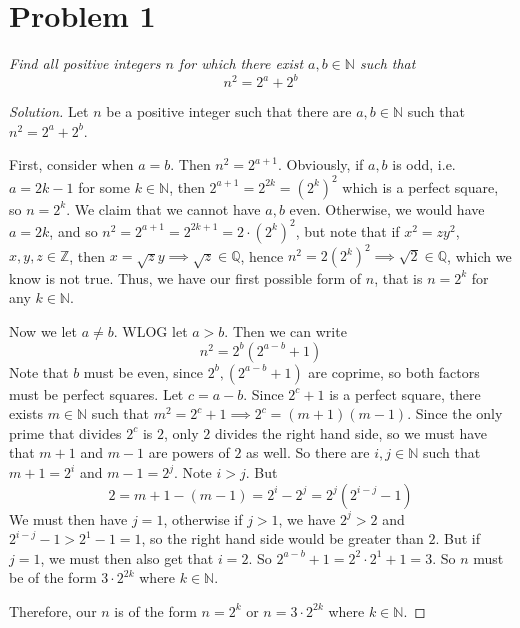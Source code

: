 \documentclass{article}
\newcommand{\N}{{\mathbb N}}
\newcommand{\Z}{{\mathbb Z}}
\newcommand{\Q}{{\mathbb Q}}
\begin{document}
\section*{Problem 1}
{\it Find all positive integers $n$ for which there exist $a,b \in \N$ such that
	\[
		n^2 = 2^a + 2^b
	\]
}
\begin{proof}[Solution]\let\qed\relax
	Let $n$ be a positive integer such that
	there are $a,b \in \N$ such that $n^2 = 2^a + 2^b$.

	First, consider when $a = b$.
	Then $n^2 = 2^{a+1}$.
	Obviously, if $a,b$ is odd, i.e. $a = 2k-1$ for some $k \in \N$,
	then $2^{a+1} = 2^{2k} = (2^{k})^2$ which is a perfect square,
	so $n = 2^{k}$.
	We claim that we cannot have $a,b$ even.
	Otherwise, we would have $a = 2k$, and so $n^2 = 2^{a+1} = 2^{2k+1} = 2\cdot (2^k)^2$,
	but note that if $x^2 = zy^2$, $x,y,z \in \Z$,
	then $x = \sqrt{z}y \implies \sqrt{z} \in \Q$,
	hence $n^2 = 2(2^k)^2 \implies \sqrt{2} \in \Q$, which we know is not true.
	Thus, we have our first possible form of $n$,
	that is $n = 2^k$ for any $k \in \N$.

	Now we let $a \neq b$.
	WLOG let $a > b$.
	Then we can write
	\[
		n^2 = 2^b(2^{a-b} + 1)
	\]
	Note that $b$ must be even,
	since $2^b, (2^{a-b}+1)$ are coprime, so both factors must be perfect squares.
	Let $c = a - b$.
	Since $2^c + 1$ is a perfect square,
	there exists $m \in \N$ such that $m^2 = 2^c + 1
	\implies 2^c = (m+1)(m-1)$.
	Since the only prime that divides $2^c$ is $2$,
	only $2$ divides the right hand side,
	so we must have that $m+1$ and $m-1$ are powers of $2$ as well.
	So there are $i,j \in \N$ such that $m+1 = 2^i$ and $m-1 = 2^j$.
	Note $i > j$.
	But
	\[
		2 = m + 1 - (m - 1) = 2^i - 2^j = 2^j(2^{i-j}-1)
	\]
	We must then have $j = 1$,
	otherwise if $j > 1$, we have $2^j > 2$ and $2^{i-j} - 1 > 2^1 - 1 = 1$,
	so the right hand side would be greater than $2$.
	But if $j = 1$, we must then also get that $i = 2$.
	So $2^{a-b} + 1 = 2^2\cdot 2^1 + 1 = 3$.
	So $n$ must be of the form $3\cdot 2^{2k}$ where $k \in \N$.

	Therefore, our $n$ is of the form $n=2^k$ or $n = 3\cdot 2^{2k}$ where $k \in \N$.
\end{proof}
\clearpage
\end{document}
